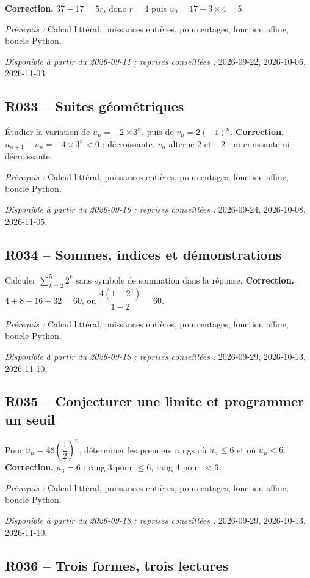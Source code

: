\ifmxteacher\textbf{Correction.} $37-17=5r$, donc $r=4$ puis $u_0=17-3\times4=5$.\par\textit{Prérequis :} Calcul littéral, puissances entières, pourcentages, fonction affine, boucle Python.\par\textit{Disponible à partir du 2026-09-11 ; reprises conseillées :} 2026-09-22, 2026-10-06, 2026-11-03.\fi
{}\subsection*{R033 -- Suites géométriques}\label{R033}
Étudier la variation de $u_n=-2\times3^n$, puis de $v_n=2(-1)^n$.
\ifmxteacher\textbf{Correction.} $u_{n+1}-u_n=-4\times3^n<0$ : décroissante. $v_n$ alterne 2 et $-2$ : ni croissante ni décroissante.\par\textit{Prérequis :} Calcul littéral, puissances entières, pourcentages, fonction affine, boucle Python.\par\textit{Disponible à partir du 2026-09-16 ; reprises conseillées :} 2026-09-24, 2026-10-08, 2026-11-05.\fi
{}\subsection*{R034 -- Sommes, indices et démonstrations}\label{R034}
Calculer $\sum_{k=2}^{5}2^k$ sans symbole de sommation dans la réponse.
\ifmxteacher\textbf{Correction.} $4+8+16+32=60$, ou $\dfrac{4(1-2^4)}{1-2}=60$.\par\textit{Prérequis :} Calcul littéral, puissances entières, pourcentages, fonction affine, boucle Python.\par\textit{Disponible à partir du 2026-09-18 ; reprises conseillées :} 2026-09-29, 2026-10-13, 2026-11-10.\fi
{}\subsection*{R035 -- Conjecturer une limite et programmer un seuil}\label{R035}
Pour $u_n=48(\dfrac{1}{2})^n$, déterminer les premiers rangs où $u_n\leq6$ et où $u_n<6$.
\ifmxteacher\textbf{Correction.} $u_3=6$ : rang 3 pour $\leq6$, rang 4 pour $<6$.\par\textit{Prérequis :} Calcul littéral, puissances entières, pourcentages, fonction affine, boucle Python.\par\textit{Disponible à partir du 2026-09-18 ; reprises conseillées :} 2026-09-29, 2026-10-13, 2026-11-10.\fi
{}\subsection*{R036 -- Trois formes, trois lectures}\label{R036}
